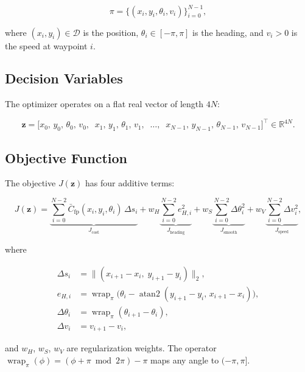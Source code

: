 \documentclass[11pt,a4paper]{article}
\begin{document}
\begin{equation}
  \pi = \bigl\{(x_i, y_i, \theta_i, v_i)\bigr\}_{i=0}^{N-1},
\end{equation}

where $(x_i, y_i) \in \mathcal{D}$ is the position, $\theta_i \in [-\pi,\pi]$
is the heading, and $v_i > 0$ is the speed at waypoint $i$.

\subsection{Decision Variables}

The optimizer operates on a flat real vector of length $4N$:

\begin{equation}
  \mathbf{z} = \bigl[
    x_0,\, y_0,\, \theta_0,\, v_0,\;\;
    x_1,\, y_1,\, \theta_1,\, v_1,\;\;
    \ldots,\;\;
    x_{N-1},\, y_{N-1},\, \theta_{N-1},\, v_{N-1}
  \bigr]^\top \in \mathbb{R}^{4N}.
\end{equation}

\subsection{Objective Function}

The objective $J(\mathbf{z})$ has four additive terms:

\begin{equation}
  \label{eq:objective}
  J(\mathbf{z}) =
    \underbrace{
      \sum_{i=0}^{N-2} \bar{C}_{\mathrm{fp}}(x_i, y_i, \theta_i)\,\Delta s_i
    }_{J_{\mathrm{cost}}}
    + w_H \underbrace{\sum_{i=0}^{N-2} e_{H,i}^2}_{J_{\mathrm{heading}}}
    + w_S \underbrace{\sum_{i=0}^{N-2} \Delta\theta_i^2}_{J_{\mathrm{smooth}}}
    + w_V \underbrace{\sum_{i=0}^{N-2} \Delta v_i^2}_{J_{\mathrm{speed}}},
\end{equation}

where

\begin{align}
  \Delta s_i &= \|(x_{i+1} - x_i,\; y_{i+1} - y_i)\|_2, \\[4pt]
  e_{H,i}    &= \operatorname{wrap}_\pi\!\bigl(
                  \theta_i - \operatorname{atan2}(y_{i+1}-y_i,\, x_{i+1}-x_i)
                \bigr), \\[4pt]
  \Delta\theta_i &= \operatorname{wrap}_\pi(\theta_{i+1} - \theta_i), \\[4pt]
  \Delta v_i &= v_{i+1} - v_i,
\end{align}

and $w_H$, $w_S$, $w_V$ are regularization weights.
The operator $\operatorname{wrap}_\pi(\phi) = (\phi + \pi \bmod 2\pi) - \pi$
maps any angle to $(-\pi, \pi]$.
\end{document}

